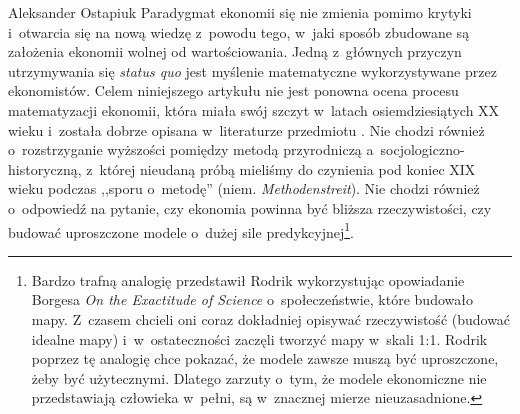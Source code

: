 \begin{artplenv}{Aleksander Ostapiuk}
Paradygmat ekonomii się nie zmienia pomimo krytyki i~otwarcia się na nową wiedzę z~powodu tego, w~jaki sposób zbudowane
są założenia ekonomii wolnej od wartościowania. Jedną z~głównych przyczyn utrzymywania się \textit{status quo }jest
myślenie matematyczne wykorzystywane przez ekonomistów. Celem niniejszego artykułu nie jest ponowna ocena procesu
matematyzacji ekonomii, która miała swój szczyt w~latach osiemdziesiątych XX wieku i~została dobrze
opisana w~literaturze przedmiotu
\parencite{beed_what_1991,debreu_mathematization_1991,weintraub_how_2002,mirowski_machine_2002,ostapiuk_matematyzacja_2017}.
Nie chodzi również o~rozstrzyganie wyższości pomiędzy metodą przyrodniczą
a~socjologiczno-historyczną, z~której nieudaną próbą mieliśmy do czynienia pod koniec XIX wieku podczas
,,sporu o~metodę'' (niem. \textit{Methodenstreit}). Nie chodzi również o~odpowiedź na pytanie, czy ekonomia powinna być
bliższa rzeczywistości, czy budować uproszczone modele o~dużej sile predykcyjnej\footnote{Bardzo trafną analogię
przedstawił Rodrik
\parencite*[s.~43–44]{rodrik_economics_2015}
wykorzystując opowiadanie Borgesa \textit{On the
Exactitude of Science} o~społeczeństwie, które budowało mapy. Z~czasem chcieli oni coraz dokładniej opisywać
rzeczywistość (budować idealne mapy) i~w~ostateczności zaczęli tworzyć mapy w~skali 1:1. Rodrik poprzez tę analogię
chce pokazać, że modele zawsze muszą być uproszczone, żeby być użytecznymi. Dlatego zarzuty o~tym, że modele
ekonomiczne nie przedstawiają człowieka w~pełni, są w~znacznej mierze nieuzasadnione.}.


\end{artplenv}
